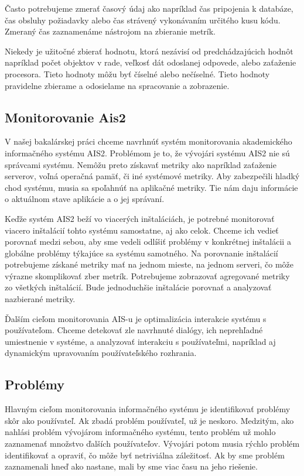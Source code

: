 \documentclass[a4paper, usesections, upjsfrontpage, disablespecwarning, thesismargins, thesislinespacing]{rnthesissvk}
\begin{document}
Často potrebujeme zmerať časový údaj ako napríklad čas pripojenia k databáze, čas obsluhy požiadavky alebo čas strávený vykonávaním určitého kusu kódu. Zmeraný čas zaznamenáme nástrojom na zbieranie metrík.

Niekedy je užitočné zbierať hodnotu, ktorá nezávisí od predchádzajúcich hodnôt napríklad počet objektov v rade, veľkosť dát odoslanej odpovede, alebo zaťaženie procesora. 
Tieto hodnoty môžu byť číselné alebo nečíselné. Tieto hodnoty pravidelne zbierame a odosielame na spracovanie a zobrazenie.

\subsection{Monitorovanie Ais2}

V našej bakalárskej práci chceme navrhnúť systém monitorovania akademického informačného systému AIS2.
Problémom je to, že vývojári systému AIS2 nie sú správcami systému.
Nemôžu preto získavať metriky ako napríklad zaťaženie serverov, voľná operačná pamäť, či iné systémové metriky.
Aby zabezpečili hladký chod systému, musia sa spoľahnúť na aplikačné metriky.
Tie nám daju informácie o aktuálnom stave aplikácie a o jej správaní.

Keďže systém AIS2 beží vo viacerých inštaláciách, 
	je potrebné monitorovať viacero inštalácií tohto systému samostatne, aj ako celok.
Chceme ich vedieť porovnať medzi sebou, 
	aby sme vedeli odlíšiť problémy v konkrétnej inštalácii a globálne problémy týkajúce sa systému samotného.
Na porovnanie inštalácií potrebujeme získané metriky mať na jednom mieste, na jednom serveri, čo môže výrazne skomplikovať zber metrík.
Potrebujeme zobrazovať agregované metriky zo všetkých inštalácií.
Bude jednoduchšie inštalácie porovnať a analyzovať nazbierané metriky.

Ďalším cieľom monitorovania AIS-u je optimalizácia interakcie systému s používateľom.
Chceme detekovať zle navrhnuté dialógy, ich neprehľadné umiestnenie v systéme, a analyzovať interakciu s používateľmi, napríklad aj dynamickým upravovaním používateľského rozhrania.

\subsection{Problémy}

Hlavným cieľom monitorovania informačného systému je identifikovať problémy skôr ako používateľ.
Ak zbadá problém používateľ, už je neskoro.
Medzitým, ako nahlási problém vývojárom informačného systému, tento problém už mohlo zaznamenať množstvo ďalších používateľov.
Vývojári potom musia rýchlo problém identifikovať a opraviť, čo môže byť netriviálna záležitosť.
Ak by sme problém zaznamenali hneď ako nastane, mali by sme viac času na jeho riešenie.
\end{document}
